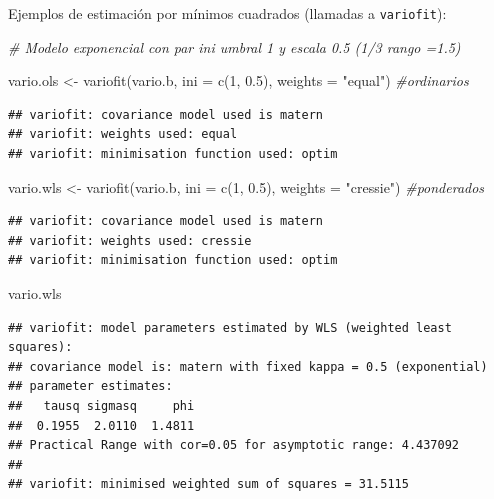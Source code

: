 \documentclass[
  spanish,
]{book}
\newenvironment{Shaded}{\begin{snugshade}}{\end{snugshade}}
\newcommand{\AttributeTok}[1]{\textcolor[rgb]{0.77,0.63,0.00}{#1}}
\newcommand{\CommentTok}[1]{\textcolor[rgb]{0.56,0.35,0.01}{\textit{#1}}}
\newcommand{\DecValTok}[1]{\textcolor[rgb]{0.00,0.00,0.81}{#1}}
\newcommand{\FloatTok}[1]{\textcolor[rgb]{0.00,0.00,0.81}{#1}}
\newcommand{\FunctionTok}[1]{\textcolor[rgb]{0.00,0.00,0.00}{#1}}
\newcommand{\NormalTok}[1]{#1}
\newcommand{\OtherTok}[1]{\textcolor[rgb]{0.56,0.35,0.01}{#1}}
\newcommand{\StringTok}[1]{\textcolor[rgb]{0.31,0.60,0.02}{#1}}
\theoremstyle{break}
\theoremstyle{definition}
\theoremstyle{definition}
\theoremstyle{definition}
\theoremstyle{definition}
\theoremstyle{remark}
\begin{document}
Ejemplos de estimación por mínimos cuadrados (llamadas a \texttt{variofit}):

\begin{Shaded}
\begin{Highlighting}[]
\CommentTok{\#   Modelo exponencial con par ini umbral 1 y escala 0.5 (1/3 rango =1.5)}

\NormalTok{vario.ols }\OtherTok{\textless{}{-}} \FunctionTok{variofit}\NormalTok{(vario.b, }\AttributeTok{ini =} \FunctionTok{c}\NormalTok{(}\DecValTok{1}\NormalTok{, }\FloatTok{0.5}\NormalTok{), }\AttributeTok{weights =} \StringTok{"equal"}\NormalTok{)  }\CommentTok{\#ordinarios}
\end{Highlighting}
\end{Shaded}

\begin{verbatim}
## variofit: covariance model used is matern 
## variofit: weights used: equal 
## variofit: minimisation function used: optim
\end{verbatim}

\begin{Shaded}
\begin{Highlighting}[]
\NormalTok{vario.wls }\OtherTok{\textless{}{-}} \FunctionTok{variofit}\NormalTok{(vario.b, }\AttributeTok{ini =} \FunctionTok{c}\NormalTok{(}\DecValTok{1}\NormalTok{, }\FloatTok{0.5}\NormalTok{), }\AttributeTok{weights =} \StringTok{"cressie"}\NormalTok{)  }\CommentTok{\#ponderados}
\end{Highlighting}
\end{Shaded}

\begin{verbatim}
## variofit: covariance model used is matern 
## variofit: weights used: cressie 
## variofit: minimisation function used: optim
\end{verbatim}

\begin{Shaded}
\begin{Highlighting}[]
\NormalTok{vario.wls}
\end{Highlighting}
\end{Shaded}

\begin{verbatim}
## variofit: model parameters estimated by WLS (weighted least squares):
## covariance model is: matern with fixed kappa = 0.5 (exponential)
## parameter estimates:
##   tausq sigmasq     phi 
##  0.1955  2.0110  1.4811 
## Practical Range with cor=0.05 for asymptotic range: 4.437092
## 
## variofit: minimised weighted sum of squares = 31.5115
\end{verbatim}
\end{document}
